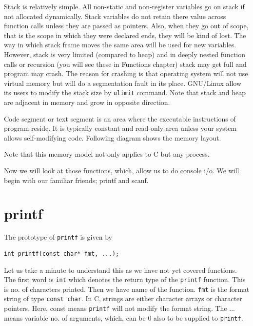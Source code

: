 Stack is relatively simple. All non-static and non-register variables go on
stack if not allocated dynamically. Stack variables do not retain there value
across function calls unless
they are passed as pointers. Also, when they go out of
scope, that is the scope in which they were declared ends, they will be kind of
lost. The way in which stack frame moves the same area will be used for new
variables. However, stack is very limited (compared to heap) and in deeply
nested function calls or recursion (you will see these in Functions chapter)
stack may get full and program may crash. The reason for crashing is that
operating system will not use virtual memory but will do a segmentation fault
in its place. GNU/Linux allow its users to modify the stack size by 
\texttt{ulimit} command. Note that stack and heap are adjacent in memory and 
grow in opposite direction.

Code segment or text segment is an area where the executable instructions of
program reside. It is typically constant and read-only area unless your system
allows self-modifying code. Following diagram shows the memory layout.

Note that this memory model not only applies to C but any process.

Now we will look at those functions, which, allow us to do console i/o. We will
begin with our familiar friends; printf and scanf.

\section{printf}
The prototype of \texttt{printf} is given by

\begin{verbatim}
int printf(const char* fmt, ...);
\end{verbatim}

Let us take a minute to understand this as we have not yet covered
functions. The first word is \texttt{int} which denotes the return type of the
\texttt{printf} function. This is no. of characters printed. Then we have name
of the function. \texttt{fmt} is the format string of type \texttt{const
 char}. In C, strings are either character arrays or character pointers. Here,
const means \texttt{printf} will not modify the format string. The ... means
variable no. of arguments, which, can be 0 also to be supplied to
\texttt{printf}.

